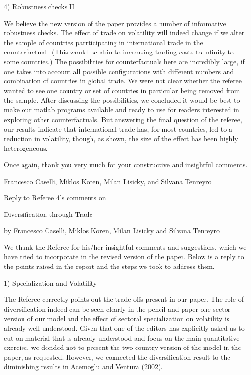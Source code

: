 \documentclass[12pt]{article}
\begin{document}
4) Robustness checks II

We believe the new version of the paper provides a number of informative
robustness checks. The effect of trade on volatility will indeed change if
we alter the sample of countries parrticipating in international trade in
the counterfactual.\ (This would be akin to increasing trading costs to
infinity to some countries.) The possibilities for counterfactuals here are
incredibly large, if one takes into account all possible configurations with
different numbers and combination of countries in global trade. We were not
clear whether the referee wanted to see one country or set of countries in
particular being removed from the sample. After discussing the
possibilities, we concluded it would be best to make our matlab programs
available and ready to use for readers interested in exploring other
counterfactuals. But answering the final question of the referee, our
results indicate that international trade has, for most countries, led to a
reduction in volatility, though, as shown, the size of the effect has been
highly heterogeneous.

\medskip \medskip \bigskip

Once again, thank you very much for your constructive and insightful
comments.

Francesco Caselli, Miklos Koren, Milan Lisicky, and Silvana Tenreyro

\pagebreak

\begin{center}
\thispagestyle{plain}\setcounter{page}{1}

Reply to Referee 4's comments on

{\Large Diversification through Trade}

by Francesco Caselli, Miklos Koren, Milan Lisicky and Silvana
Tenreyro\medskip \medskip \bigskip
\end{center}

We thank the Referee for his/her insightful comments and suggestions, which
we have tried to incorporate in the revised version of the paper. Below is a
reply to the points raised in the report and the steps we took to address
them.

\bigskip

1) Specialization and Volatility

The Referee correctly points out the trade offs present in our paper. The
role of diversification indeed can be seen clearly in the pencil-and-paper
one-sector version of our model and the effect of sectoral specialization on
volatility is already well understood. Given that one of the editors has
explicitly asked us to cut on material that is already understood and focus
on the main quantitative exercise, we decided not to present the two-country
version of the model in the paper, as requested. However, we connected the
diversification result to the diminishing results in Acemoglu and Ventura
(2002). 
\end{document}
